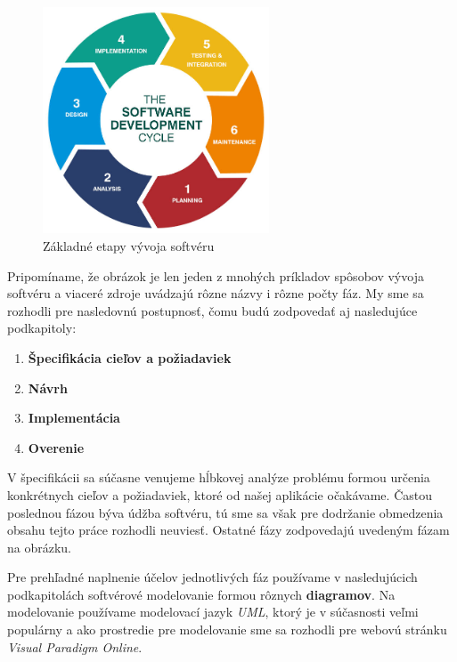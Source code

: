 \documentclass[twoside,slovak, a4paper]{article}
\begin{document}
\begin{figure}[tbh]
  \centering
  \includegraphics[width=0.6\textwidth]{pics/software_dev.png}
  \caption{Základné etapy vývoja softvéru\cite{TP:SSD}}
  \label{fig:5}
\end{figure}

Pripomíname, že obrázok je len jeden z mnohých príkladov spôsobov vývoja softvéru a viaceré zdroje uvádzajú rôzne názvy i rôzne počty fáz. My sme sa rozhodli pre nasledovnú postupnosť, čomu budú zodpovedať aj nasledujúce podkapitoly:

\begin{enumerate}
    \setlength{\itemsep}{2pt}
    \setlength{\parskip}{1pt}
    
    \item \textbf{Špecifikácia cieľov a požiadaviek}
    \item \textbf{Návrh}
    \item \textbf{Implementácia}
    \item \textbf{Overenie}
\end{enumerate}

V špecifikácii sa súčasne venujeme hĺbkovej analýze problému formou určenia konkrétnych cieľov a požiadaviek, ktoré od našej aplikácie očakávame. Častou poslednou fázou býva údžba softvéru, tú sme sa však pre dodržanie obmedzenia obsahu tejto práce rozhodli neuviesť. Ostatné fázy zodpovedajú uvedeným fázam na obrázku.

Pre prehľadné naplnenie účelov jednotlivých fáz používame v nasledujúcich podkapitolách softvérové modelovanie formou rôznych \textbf{diagramov}. Na modelovanie používame modelovací jazyk \textit{UML}, ktorý je v súčasnosti veľmi populárny a ako prostredie pre modelovanie sme sa rozhodli pre webovú stránku \textit{Visual Paradigm Online}.
\end{document}
